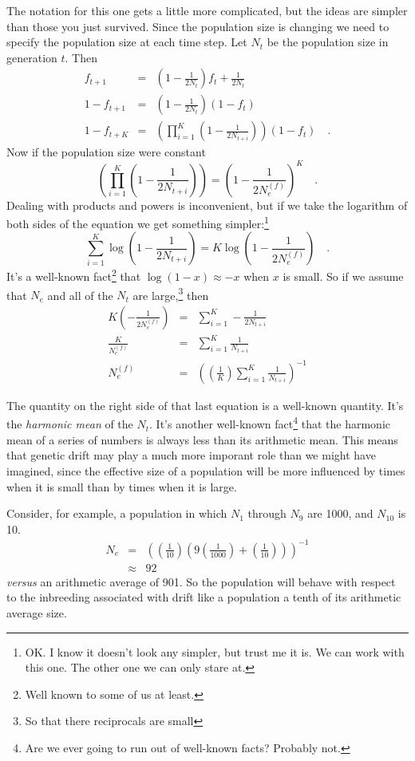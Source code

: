 \documentclass[12pt]{article}
\begin{document}
The notation for this one gets a little more complicated, but the
ideas are simpler than those you just survived. Since the population
size is changing we need to specify the population size at each time
step. Let $N_t$ be the population size in generation $t$. Then
\begin{eqnarray*}
f_{t+1} &=& \left(1-\frac{1}{2N_t}\right)f_t + \frac{1}{2N_t} \\
1 - f_{t+1} &=& \left(1-\frac{1}{2N_t}\right)(1-f_t) \\
1 - f_{t+K} &=&
\left(\prod_{i=1}^K\left(1-\frac{1}{2N_{t+i}}\right)\right)(1-f_t) \quad .
\end{eqnarray*}
Now if the population size were constant
\[
\left(\prod_{i=1}^K\left(1-\frac{1}{2N_{t+i}}\right)\right) =
\left(1 - \frac{1}{2N_e^{(f)}}\right)^K \quad .
\]
Dealing with products and powers is inconvenient, but if we take the
logarithm of both sides of the equation we get something
simpler:\footnote{OK. I know it doesn't look any simpler, but trust me
  it is. We can work with this one. The other one we can only stare
  at.} 
\[
\sum_{i=1}^K\log\left(1-\frac{1}{2N_{t+i}}\right) =
K\log\left(1 - \frac{1}{2N_e^{(f)}}\right) \quad .
\]
It's a well-known fact\footnote{Well known to some of us at least.}
that $\log(1-x) \approx -x$ when $x$ is small. So if we assume that
$N_e$ and all of the $N_{t}$ are large,\footnote{So that there
  reciprocals are small} then
\begin{eqnarray*}
K\left(-\frac{1}{2N_e^{(f)}}\right)
  &=& \sum_{i=1}^K-\frac{1}{2N_{t+i}} \\
\frac{K}{N_e^{(f)}} &=& \sum_{i=1}^K\frac{1}{N_{t+i}} \\
N_e^{(f)} &=& \left(\left(\frac{1}{K}\right)
                    \sum_{i=1}^K\frac{1}{N_{t+i}}\right)^{-1}
\end{eqnarray*}

The quantity on the right side of that last equation is a well-known
quantity. It's the {\it harmonic mean} of the $N_{t}$.  It's another
well-known fact\footnote{Are we ever going to run out of well-known
  facts? Probably not.} that the harmonic mean of a series of numbers
is always less than its arithmetic mean. This means that genetic drift
may play a much more imporant role than we might have imagined, since
the effective size of a population will be more influenced by times
when it is small than by times when it is large.

Consider, for example, a population in which $N_1$ through $N_9$ are
1000, and $N_{10}$ is 10.
\begin{eqnarray*}
N_e &=& \left(\left(\frac{1}{10}\right)
            \left(9\left(\frac{1}{1000}\right) +
                   \left(\frac{1}{10}\right)\right)\right)^{-1} \\
    &\approx& 92
\end{eqnarray*}
{\it versus\/} an arithmetic average of 901. So the population will
behave with respect to the inbreeding associated with drift like a
population a tenth of its arithmetic average size.
\end{document}
